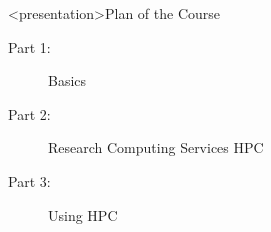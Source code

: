 \documentclass[handout]{beamer}
\begin{document}
\begin{frame}<presentation>{Plan of the Course}
\begin{description}
\item[Part 1:]{Basics}
\item[Part 2:]{Research Computing Services HPC}
\item[Part 3:]{Using HPC}
\end{description}
\end{frame}


\end{document}
